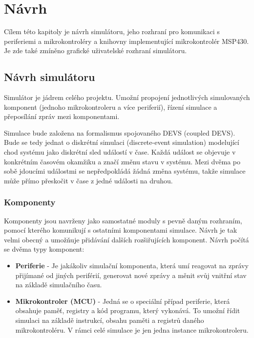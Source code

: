 \chapter{Návrh}
\label{navrh}

Cílem této kapitoly je návrh simulátoru, jeho rozhraní pro komunikaci s periferiemi a mikrokontroléry a knihovny implementující mikrokontrolér MSP430.
Je zde také zmíněno grafické uživatelské rozhraní simulátoru.

\section{Návrh simulátoru}

Simulátor je jádrem celého projektu. Umožní propojení jednotlivých simulovaných komponent (jednoho mikrokontroleru a více periferií), řízení simulace
a přeposílání zpráv mezi komponentami.

Simulace bude založena na formalismus spojovaného DEVS (coupled DEVS). Bude se tedy jednat o diskrétní simulaci (discrete-event simulation) 
modelující chod systému jako diskrétní sled událostí v čase. Každá událost se objevuje v konkrétním časovém okamžiku a značí změnu stavu v systému.
Mezi dvěma po sobě jdoucími událostmi se nepředpokládá žádná změna systému, takže simulace může přímo přeskočit v čase z jedné události na druhou.

\subsection{Komponenty}

Komponenty jsou navrženy jako samostatné moduly s pevně daným rozhraním, pomocí kterého komunikují s ostatními komponentami simulace. Návrh je
tak velmi obecný a umožňuje přidávání dalších rozšiřujících komponent.
Návrh počítá se dvěma typy komponent:

\begin{itemize}
\item \textbf{Periferie} - Je jakákoliv simulační komponenta, která umí reagovat na zprávy přijímané od jiných periférií, generovat nové zprávy a měnit svůj vnitřní stav na základě simulačního času.
\item \textbf{Mikrokontroler (MCU)} - Jedná se o speciální případ periferie, která obsahuje paměť, registry a kód programu, který vykonává.
To umožní řídit simulaci na základě instrukcí, obsahu paměti a registrů daného mikrokontroléru.  V rámci celé simulace je jen jedna instance mikrokontroleru. 
\end{itemize}

